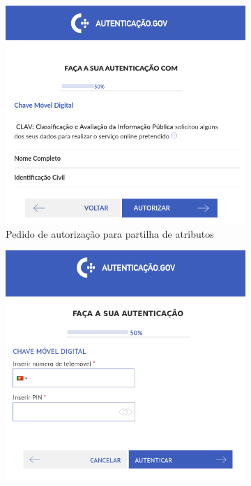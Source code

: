 \begin{figure}[H]
    \centering
    \begin{subfigure}{.32\textwidth}
        \centering
        \includegraphics[width=1\linewidth]{img/CMDauto.png}
        \caption{Pedido de autorização para partilha de atributos\label{fig:CMDauto}}
    \end{subfigure}
    \begin{subfigure}{.32\textwidth}
        \centering
        \includegraphics[width=1\linewidth]{img/CMDcreds.png}

\end{subfigure}
\end{figure}
